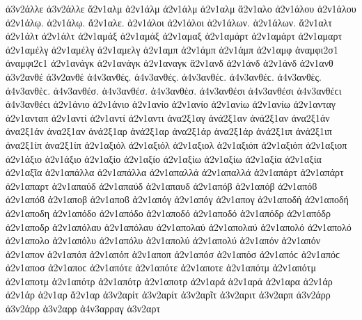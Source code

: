 {ἀ3ν2άλλε ἀ3ν2άλλε
ἄ2ν1αλμ   %
ἀ2ν1άλμ ἀ2ν1άλμ   %
ἀ2ν1αλμ
ἄ2ν1αλο   %
ἀ2ν1άλου ἀ2ν1άλου
ἀ2ν1άλῳ. ἀ2ν1άλῳ.
ἄ2ν1αλε.
ἀ2ν1άλοι ἀ2ν1άλοι
ἀ2ν1άλων. ἀ2ν1άλων.
ἄ2ν1αλτ   %
ἀ2ν1άλτ ἀ2ν1άλτ
ἀ2ν1αμάξ ἀ2ν1αμάξ   %
ἀ2ν1αμαξ
ἀ2ν1αμάρτ ἀ2ν1αμάρτ   %
ἀ2ν1αμαρτ
ἀ2ν1αμέλγ ἀ2ν1αμέλγ   %
ἀ2ν1αμελγ
ἀ2ν1αμπ   %
ἀ2ν1άμπ ἀ2ν1άμπ   %
ἀ2ν1αμφ   %
ἀναμφι2σ1 ἀναμφι2ϲ1   %
ἀ2ν1ανάγκ ἀ2ν1ανάγκ   %
ἀ2ν1αναγκ
ἄ2ν1ανδ   %
ἀ2ν1άνδ ἀ2ν1άνδ
ἀ2ν1ανθ   %
ἀ3ν2ανθέ ἀ3ν2ανθέ   %
ἀ4ν3ανθές. ἀ4ν3ανθές. ἀ4ν3ανθέϲ. ἀ4ν3ανθέϲ.   %
ἀ4ν3ανθὲς. ἀ4ν3ανθὲϲ.
ἀ4ν3ανθέσ. ἀ4ν3ανθέσ.
ἀ4ν3ανθὲσ.
ἀ4ν3ανθέσι ἀ4ν3ανθέσι ἀ4ν3ανθέϲι ἀ4ν3ανθέϲι
ἀ2ν1άνιο ἀ2ν1άνιο   %
ἀ2ν1ανίο ἀ2ν1ανίο
ἀ2ν1ανίω ἀ2ν1ανίω
ἀ2ν1ανταγ   %
ἀ2ν1ανταπ   %
ἀ2ν1αντί ἀ2ν1αντί   %
ἀ2ν1αντι
ἀνα2ξ1αγ   %
ἀνά2ξ1αν ἀνά2ξ1αν   %
ἀνα2ξ1άν ἀνα2ξ1άν
ἀνα2ξ1αν   %
ἀνά2ξ1αρ ἀνά2ξ1αρ   %
ἀνα2ξ1άρ ἀνα2ξ1άρ
ἀνά2ξ1ιπ ἀνά2ξ1ιπ   %
ἀνα2ξ1ίπ ἀνα2ξ1ίπ
ἀ2ν1αξιόλ ἀ2ν1αξιόλ   %
ἀ2ν1αξιολ
ἀ2ν1αξιόπ ἀ2ν1αξιόπ   %
ἀ2ν1αξιοπ
ἀ2ν1άξιο ἀ2ν1άξιο   %
ἀ2ν1αξίο ἀ2ν1αξίο
ἀ2ν1αξίω ἀ2ν1αξίω
ἀ2ν1αξία ἀ2ν1αξία
ἀ2ν1αξῖα
ἀ2ν1απάλλα ἀ2ν1απάλλα   %
ἀ2ν1απαλλά ἀ2ν1απαλλά
ἀ2ν1απάρτ ἀ2ν1απάρτ   %
ἀ2ν1απαρτ
ἀ2ν1απαύδ ἀ2ν1απαύδ   %
ἀ2ν1απαυδ
ἀ2ν1απόβ ἀ2ν1απόβ ἀ2ν1απόϐ ἀ2ν1απόϐ %
ἀ2ν1αποβ ἀ2ν1αποϐ
ἀ2ν1απόγ ἀ2ν1απόγ   %
ἀ2ν1απογ
ἀ2ν1αποδή ἀ2ν1αποδή   %
ἀ2ν1αποδη
ἀ2ν1απόδο ἀ2ν1απόδο   %
ἀ2ν1αποδό ἀ2ν1αποδό
ἀ2ν1απόδρ ἀ2ν1απόδρ   %
ἀ2ν1αποδρ
ἀ2ν1απόλαυ ἀ2ν1απόλαυ   %
ἀ2ν1απολαύ ἀ2ν1απολαύ
ἀ2ν1απολό ἀ2ν1απολό   %
ἀ2ν1απολο
ἀ2ν1απόλυ ἀ2ν1απόλυ   %
ἀ2ν1απολύ ἀ2ν1απολύ
ἀ2ν1απόν ἀ2ν1απόν   %
ἀ2ν1απον
ἀ2ν1απόπ ἀ2ν1απόπ   %
ἀ2ν1αποπ
ἀ2ν1απόσ ἀ2ν1απόσ ἀ2ν1απόϲ ἀ2ν1απόϲ   %
ἀ2ν1αποσ ἀ2ν1αποϲ
ἀ2ν1απότε ἀ2ν1απότε   %
ἀ2ν1αποτε
ἀ2ν1απότμ ἀ2ν1απότμ   %
ἀ2ν1αποτμ
ἀ2ν1απότρ ἀ2ν1απότρ   %
ἀ2ν1αποτρ
ἀ2ν1αρά ἀ2ν1αρά   %
ἀ2ν1αρα
ἀ2ν1άρ ἀ2ν1άρ   %
ἀ2ν1αρ
ἄ2ν1αρ   %
ἀ3ν2αρίτ ἀ3ν2αρίτ   %
ἀ3ν2αρῖτ   %
ἀ3ν2αριτ   %
ἀ3ν2αρπ   %
ἀ3ν2άρρ ἀ3ν2άρρ   %
ἀ3ν2αρρ
ἀ4ν3αρραγ   %
ἀ3ν2αρτ   %
}
